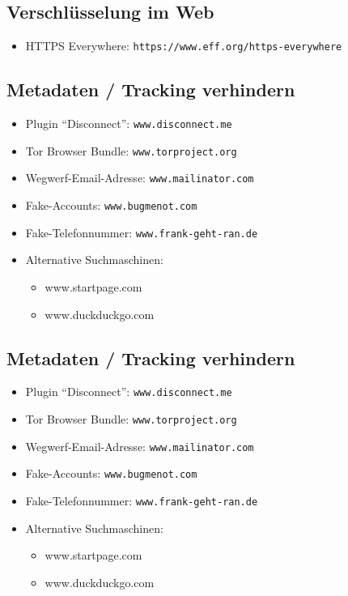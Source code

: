 \documentclass[a5paper]{scrartcl}
\begin{document}
\subsection*{Verschlüsselung im Web}
\begin{itemize}
  \item HTTPS Everywhere: \texttt{https://www.eff.org/https-everywhere}
\end{itemize}
\pagebreak
\subsection*{Metadaten / Tracking verhindern}
\begin{itemize}
  \item Plugin ``Disconnect'': \texttt{www.disconnect.me}
  
  \item Tor Browser Bundle: \texttt{www.torproject.org}
  \item Wegwerf-Email-Adresse: \texttt{www.mailinator.com}
  \item Fake-Accounts: \texttt{www.bugmenot.com}
  \item Fake-Telefonnummer: \texttt{www.frank-geht-ran.de}
  \item Alternative Suchmaschinen: 
    \begin{itemize}
      \item www.startpage.com 
      \item www.duckduckgo.com
    \end{itemize}
\end{itemize}

\pagebreak
\subsection*{Metadaten / Tracking verhindern}
\begin{itemize}
  \item Plugin ``Disconnect'': \texttt{www.disconnect.me}
  
  \item Tor Browser Bundle: \texttt{www.torproject.org}
  \item Wegwerf-Email-Adresse: \texttt{www.mailinator.com}
  \item Fake-Accounts: \texttt{www.bugmenot.com}
  \item Fake-Telefonnummer: \texttt{www.frank-geht-ran.de}
  \item Alternative Suchmaschinen: 
    \begin{itemize}
      \item www.startpage.com 
      \item www.duckduckgo.com
    \end{itemize}
\end{itemize}
\end{document}
